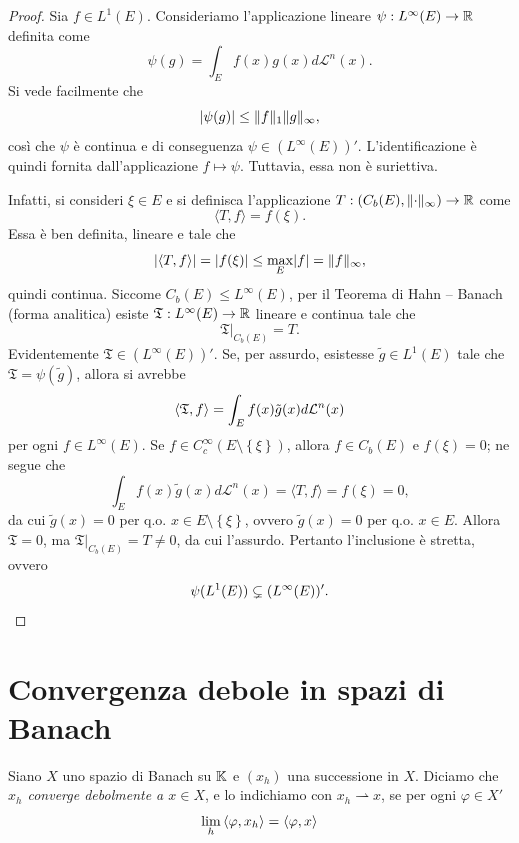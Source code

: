 \begin{proof}
	Sia $f \in L^{1}(E)$. Consideriamo l'applicazione lineare  $\psi : L^{\infty}(E) \to \mathbb{R}$ definita come
	\[ \psi(g) = \int_{E}^{}f(x)g(x)d\mathcal{L}^{n}(x).\]
	Si vede facilmente che
	\[ \lvert\psi(g)\rvert \le \lVert f\rVert_{1}\lVert g\rVert_{\infty},\]
	così che $\psi$ è continua e di conseguenza $\psi \in (L^{\infty}(E))'$. L'identificazione è quindi fornita dall'applicazione $f \mapsto \psi$. Tuttavia, essa non è suriettiva.
	
	Infatti, si consideri $\xi \in E$ e si definisca l'applicazione $T : (C_{b}(E), \lVert\cdot\rVert_{\infty}) \to \mathbb{R}$ come
	\[ \langle T, f \rangle = f(\xi). \]
	Essa è ben definita, lineare e tale che
	\[ \lvert\langle T, f \rangle\rvert = \lvert f(\xi)\rvert \le \max_E \lvert f\rvert = \lVert f\rVert_{\infty}, \]
	quindi continua. Siccome $C_{b}(E) \le L^{\infty}(E)$, per il Teorema di Hahn -- Banach (forma analitica) esiste $\mathfrak{T}: L^{\infty}(E) \to \mathbb{R}$ lineare e continua tale che 
	\[ \mathfrak{T}|_{C_{b}(E)} = T. \]
	Evidentemente $\mathfrak{T} \in (L^{\infty}(E))'$. Se, per assurdo, esistesse $\tilde{g} \in L^{1}(E)$ tale che $\mathfrak{T} = \psi(\tilde{g})$, allora si avrebbe
	\[ \Braket{\mathfrak{T}, f} = \int_{E}^{}f(x)\tilde{g}(x)d\mathcal{L}^{n}(x) \]
	per ogni $f \in L^{\infty}(E)$. Se $f \in C^{\infty}_{c}(E\setminus \left\lbrace \xi\right\rbrace )$, allora $f \in C_{b}(E)$ e $f(\xi) = 0$; ne segue che
	\[ \int_{E} f(x)\tilde{g}(x)d\mathcal{L}^{n}(x) = \langle T,f \rangle = f(\xi) = 0, \]
	da cui $\tilde{g}(x) = 0$ per q.o. $x \in E\setminus\left\lbrace \xi\right\rbrace $, ovvero $\tilde{g}(x) = 0$ per q.o. $x \in E$. Allora $\mathfrak{T} = 0$, ma $\mathfrak{T}|_{C_{b}(E)} = T \ne 0$, da cui l'assurdo. Pertanto l'inclusione è stretta, ovvero 
	\[ \psi(L^{1}(E)) \subsetneq (L^{\infty}(E))'. \qedhere\]
\end{proof}

\section{Convergenza debole in spazi di Banach}
\begin{definizione}
Siano $X$ uno spazio di Banach su $\mathbb{K}$ e $(x_h)$ una successione in $X$. Diciamo che \emph{$x_h$ converge debolmente a $x \in X$}, e lo indichiamo con $x_{h} \rightharpoonup x$, se per ogni $\varphi \in X'$
\[ \lim_{h} \braket{\varphi, x_h} = \braket{\varphi, x} \]
\end{definizione}

